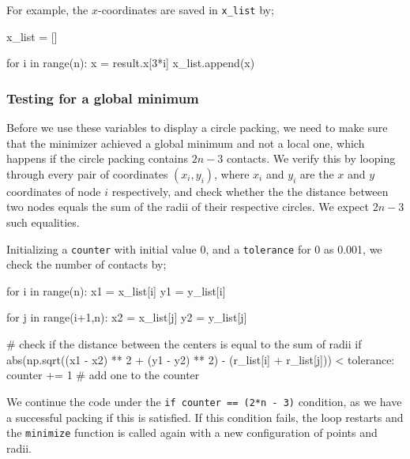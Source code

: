 \begin{flushleft}
For example, the $x$-coordinates are saved in \texttt{x\_list} by;
\end{flushleft}

\begin{code}
    x_list = []

    for i in range(n):
        x = result.x[3*i]
        x_list.append(x)
\end{code}

\subsubsection{Testing for a global minimum}

\begin{flushleft}
Before we use these variables to display a circle packing, we need to make sure that the minimizer achieved a global minimum and not a local one, which happens if the circle packing contains $2n-3$ contacts. We verify this by looping through every pair of coordinates $(x_i,y_i)$, where $x_i$ and $y_i$ are the $x$ and $y$ coordinates of node $i$ respectively, and check whether the the distance between two nodes equals the sum of the radii of their respective circles. We expect $2n-3$ such equalities.
\end{flushleft}

\begin{flushleft}
Initializing a \texttt{counter} with initial value 0, and a \texttt{tolerance} for 0 as 0.001, we check the number of contacts by;
\end{flushleft}

\begin{code}
    for i in range(n):
            x1 = x_list[i]
            y1 = y_list[i]

            for j in range(i+1,n):
                x2 = x_list[j]
                y2 = y_list[j]

                # check if the distance between the centers is equal to the sum of radii
                if abs(np.sqrt((x1 - x2) ** 2 + (y1 - y2) ** 2) - 
                            (r_list[i] + r_list[j])) < tolerance:
                    counter += 1  # add one to the counter
\end{code}

\begin{flushleft}
We continue the code under the \texttt{if counter == (2*n - 3)} condition, as we have a successful packing if this is satisfied. If this condition fails, the loop restarts and the \texttt{minimize} function is called again with a new configuration of points and radii. 
\end{flushleft}

